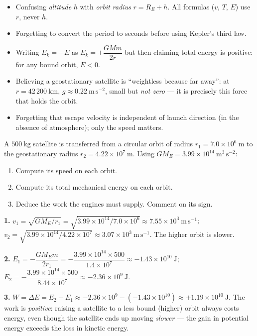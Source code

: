 \documentclass[11pt]{article}
\begin{document}
\begin{attention}
\begin{itemize}
\item Confusing \emph{altitude} $h$ with \emph{orbit radius} $r = R_E + h$. All formulas ($v$, $T$, $E$) use $r$, never $h$.
\item Forgetting to convert the period to seconds before using Kepler's third law.
\item Writing $E_k = -E$ as $E_k = +\dfrac{GMm}{2r}$ but then claiming total energy is positive: for any bound orbit, $E < 0$.
\item Believing a geostationary satellite is ``weightless because far away'': at $r = 42\,200\ \mathrm{km}$, $g \approx 0.22\ \mathrm{m\,s^{-2}}$, small but \emph{not zero} — it is precisely this force that holds the orbit.
\item Forgetting that escape velocity is independent of launch direction (in the absence of atmosphere); only the speed matters.
\end{itemize}
\end{attention}

\begin{exercice}
A $500\ \mathrm{kg}$ satellite is transferred from a circular orbit of radius $r_1 = 7.0\times 10^{6}\ \mathrm{m}$ to the geostationary radius $r_2 = 4.22\times 10^{7}\ \mathrm{m}$. Using $GM_E = 3.99\times 10^{14}\ \mathrm{m^{3}\,s^{-2}}$:
\begin{enumerate}
\item Compute its speed on each orbit.
\item Compute its total mechanical energy on each orbit.
\item Deduce the work the engines must supply. Comment on its sign.
\end{enumerate}
\end{exercice}

\begin{corrige}[Exercise 1]
\textbf{1.} $v_1 = \sqrt{GM_E/r_1} = \sqrt{3.99\times 10^{14}/7.0\times 10^{6}} \approx 7.55\times 10^{3}\ \mathrm{m\,s^{-1}}$; $v_2 = \sqrt{3.99\times 10^{14}/4.22\times 10^{7}} \approx 3.07\times 10^{3}\ \mathrm{m\,s^{-1}}$. The higher orbit is slower.

\textbf{2.} $E_1 = -\dfrac{GM_E m}{2r_1} = -\dfrac{3.99\times 10^{14}\times 500}{1.4\times 10^{7}} \approx -1.43\times 10^{10}\ \mathrm{J}$; $E_2 = -\dfrac{3.99\times 10^{14}\times 500}{8.44\times 10^{7}} \approx -2.36\times 10^{9}\ \mathrm{J}$.

\textbf{3.} $W = \Delta E = E_2 - E_1 \approx -2.36\times 10^{9} - (-1.43\times 10^{10}) \approx +1.19\times 10^{10}\ \mathrm{J}$. The work is \emph{positive}: raising a satellite to a less bound (higher) orbit always costs energy, even though the satellite ends up moving \emph{slower} — the gain in potential energy exceeds the loss in kinetic energy.
\end{corrige}
\end{document}
